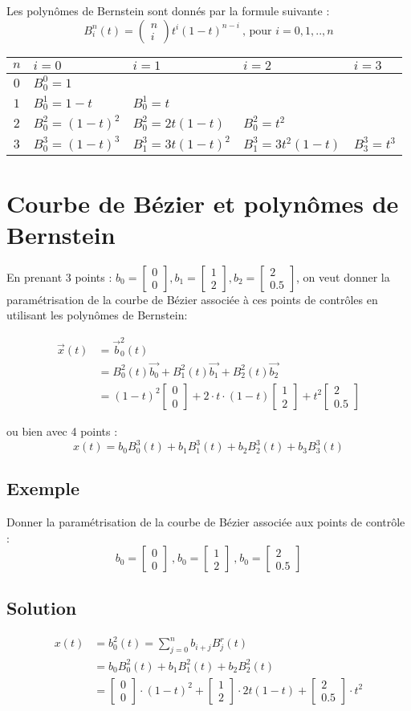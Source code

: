 \documentclass[11pt,a4paper]{report}
\newcommand{\matv}[2]{\begin{bmatrix}#1 \\ #2 \end{bmatrix}}
\newcommand{\binomial}[2]{\begin{pmatrix}#1 \\ #2\end{pmatrix}}
\begin{document}
Les polynômes de Bernstein sont donnés par la formule suivante :
$$
B_i^n(t) = \binomial{n}{i}t^i(1-t)^{n-i} \ \text{, pour $i = 0,1,..,n$} 
$$
\begin{center}
\begin{tabular}{|c|l|l|l|l|}
\hline 
$n$ & $i = 0$ & $i = 1$ & $i = 2$ & $i = 3$ \\  \hline
\hline 
$0$ & $B^0_0 = 1$ & & & \\ 
$1$ & $B^1_0 = 1-t$ & $B^1_0 = t$ & & \\ 
$2$ & $B^2_0 = (1-t)^2$ & $B^2_0 = 2t(1-t)$ & $B^2_0 = t^2$ & \\ 
$3$ & $B^3_0 = (1-t)^3$ & $B^3_1 = 3t(1-t)^2$ & $B^3_1 = 3t^2(1-t)$ & $B^3_3 = t^3$ \\ 
\hline 
\end{tabular}
\end{center}

\section{Courbe de Bézier et polynômes de Bernstein}

En prenant 3 points : $b_0 = \matv{0}{0},b_1 = \matv{1}{2},b_2 = \matv{2}{0.5}$, on veut donner la paramétrisation de la courbe de Bézier associée à ces points de contrôles en utilisant les polynômes de Bernstein:

\begin{align*}
\vec{x}(t) &= \vec{b}_0^2(t) \\ 
           &= B_0^2(t) \vec{b_0} + B_1^2(t) \vec{b_1} + B_2^2(t) \vec{b_2} \\
           &= (1-t)^2 \matv{0}{0} + 2 \cdot t \cdot (1-t) \matv{1}{2} + t^2 \matv{2}{0.5}
\end{align*}

ou bien avec 4 points :
$$
x(t) = b_0B_0^3(t)+b_1B_1^3(t)+b_2B_2^3(t)+b_3B_3^3(t)
$$

\subsection*{Exemple}
Donner la paramétrisation de la courbe de Bézier associée aux points de contrôle :
$$
b_0 = \matv{0}{0} \ \text{,} \ b_0 = \matv{1}{2} \ \text{,} \ b_0 = \matv{2}{0.5}
$$
\subsection*{Solution}
\begin{align*}
x(t) &= b_0^2(t) = \sum_{j=0}^{n}b_{i+j}B_j^r(t) \\
     &= b_0B_0^2(t) + b_1B_1^2(t) + b_2B_2^2(t) \\
     &= \matv{0}{0} \cdot (1-t)^2 + \matv{1}{2} \cdot 2t(1-t) + \matv{2}{0.5} \cdot t^2
\end{align*}
\end{document}
